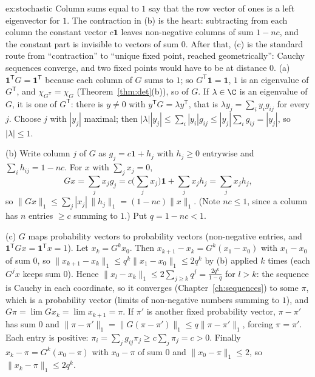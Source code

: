 \begin{solution}{ex:stochastic}
\idea Column sums equal to $1$ say that the row vector of ones is a left eigenvector for $1$. The contraction in (b) is the heart: subtracting from each column the constant vector $c\mathbf 1$ leaves non-negative columns of sum $1-nc$, and the constant part is invisible to vectors of sum $0$. After that, (c) is the standard route from ``contraction'' to ``unique fixed point, reached geometrically'': Cauchy sequences converge, and two fixed points would have to be at distance $0$.
\writeup (a) $\mathbf 1^{\mathsf T}G=\mathbf 1^{\mathsf T}$ because each column of $G$ sums to $1$; so $G^{\mathsf T}\mathbf 1=\mathbf 1$, $1$ is an eigenvalue of $G^{\mathsf T}$, and $\chi_{G^{\mathsf T}}=\chi_G$ (Theorem~\ref{thm:det}(b)), so of $G$. If $\lambda\in\C$ is an eigenvalue of $G$, it is one of $G^{\mathsf T}$: there is $y\ne0$ with $y^{\mathsf T}G=\lambda y^{\mathsf T}$, that is $\lambda y_j=\sum_iy_ig_{ij}$ for every $j$. Choose $j$ with $|y_j|$ maximal; then $|\lambda||y_j|\le\sum_i|y_i|g_{ij}\le|y_j|\sum_ig_{ij}=|y_j|$, so $|\lambda|\le1$.

(b) Write column $j$ of $G$ as $g_j=c\mathbf 1+h_j$ with $h_j\ge0$ entrywise and $\sum_ih_{ij}=1-nc$. For $x$ with $\sum_jx_j=0$,
\[
Gx=\sum_jx_jg_j=c\Big(\sum_jx_j\Big)\mathbf 1+\sum_jx_jh_j=\sum_jx_jh_j ,
\]
so $\|Gx\|_1\le\sum_j|x_j|\,\|h_j\|_1=(1-nc)\|x\|_1$. (Note $nc\le1$, since a column has $n$ entries $\ge c$ summing to $1$.) Put $q=1-nc<1$.

(c) $G$ maps probability vectors to probability vectors (non-negative entries, and $\mathbf 1^{\mathsf T}Gx=\mathbf 1^{\mathsf T}x=1$). Let $x_k=G^kx_0$. Then $x_{k+1}-x_k=G^k(x_1-x_0)$ with $x_1-x_0$ of sum $0$, so $\|x_{k+1}-x_k\|_1\le q^k\|x_1-x_0\|_1\le2q^k$ by (b) applied $k$ times (each $G^jx$ keeps sum $0$). Hence $\|x_l-x_k\|_1\le2\sum_{j\ge k}q^j=\frac{2q^k}{1-q}$ for $l>k$: the sequence is Cauchy in each coordinate, so it converges (Chapter~\ref{ch:sequences}) to some $\pi$, which is a probability vector (limits of non-negative numbers summing to $1$), and $G\pi=\lim Gx_k=\lim x_{k+1}=\pi$. If $\pi'$ is another fixed probability vector, $\pi-\pi'$ has sum $0$ and $\|\pi-\pi'\|_1=\|G(\pi-\pi')\|_1\le q\|\pi-\pi'\|_1$, forcing $\pi=\pi'$. Each entry is positive: $\pi_i=\sum_jg_{ij}\pi_j\ge c\sum_j\pi_j=c>0$. Finally $x_k-\pi=G^k(x_0-\pi)$ with $x_0-\pi$ of sum $0$ and $\|x_0-\pi\|_1\le2$, so $\|x_k-\pi\|_1\le2q^k$.


\end{solution}
